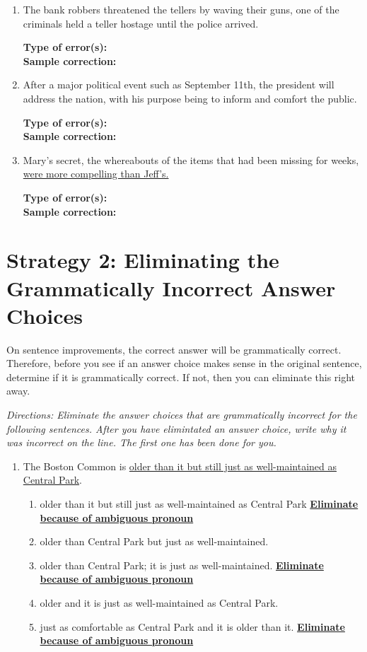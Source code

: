 \documentclass[12pt]{book}
\newcommand{\longline}{\underline{\hspace{2in}} }
\begin{document}
\begin{enumerate}
\begin{enumerate}
\item The bank robbers threatened the tellers by waving their guns, one of the criminals held a teller hostage until the police arrived. 

\bigskip
\textbf{Type of error(s):} \hrulefill  \\
\textbf{Sample correction:} \hrulefill

\item After a major political event such as September 11th, the president will address the nation, with his purpose being to inform and comfort the public.

\bigskip
\textbf{Type of error(s):} \hrulefill  \\
\textbf{Sample correction:} \hrulefill

\item Mary's secret, the whereabouts of the items that had been missing for weeks, \ul{were more compelling than Jeff's.}

\bigskip
\textbf{Type of error(s):} \hrulefill  \\
\textbf{Sample correction:} \hrulefill

\end{enumerate}

\newpage

\section{Strategy 2: Eliminating the Grammatically Incorrect Answer Choices}
On sentence improvements, the correct answer will be grammatically correct. Therefore, before
you see if an answer choice makes sense in the original sentence, determine if it is grammatically
correct. If not, then you can eliminate this right away.

\bigskip
\textit{Directions: Eliminate the answer choices that are grammatically incorrect for the following sentences. After you have elimintated an answer choice, write why it was incorrect on the line. The first one has been done for you.}

\begin{enumerate}
\item The Boston Common is \ul{ older than it but still just as well-maintained as Central Park}.
\begin{enumerate}[label=(\Alph*)]

\item older than it but still just as well-maintained as Central Park \textbf{ \ul{Eliminate because of ambiguous pronoun}}
\item older than Central Park but just as well-maintained. \longline
\item  older than Central Park; it is just as well-maintained. \textbf{ \ul{Eliminate because of ambiguous pronoun}}
\item older and it is just as well-maintained as Central Park. \longline
\item just as comfortable as Central Park and it is older than it. \textbf{ \ul{Eliminate because of ambiguous pronoun}}
\end{enumerate}


\end{enumerate}
\end{enumerate}
\end{document}

